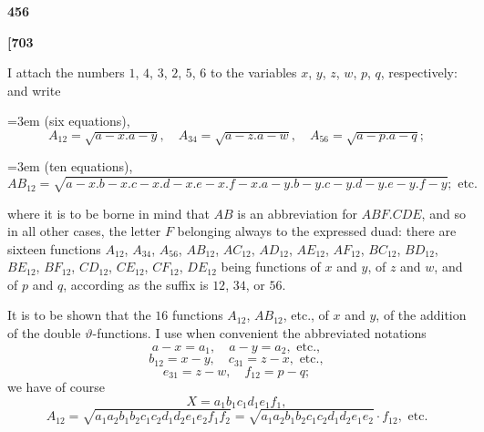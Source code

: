 \documentclass[12pt,a4paper]{article}
\theoremstyle{definition}
\begin{document}
\vspace{1em}

\begin{center}
\textbf{456}
\end{center}

\vspace{0.5em}

\noindent\textbf{[703}

\vspace{0.5em}

I attach the numbers $1$, $4$, $3$, $2$, $5$, $6$ to the variables $x$, $y$, $z$, $w$, $p$, $q$, respectively: and write

\noindent\hangindent=3em (six equations),
\[
A_{12} = \sqrt{a - x . a - y},\quad A_{34} = \sqrt{a - z . a - w},\quad A_{56} = \sqrt{a - p . a - q};
\]

\noindent\hangindent=3em (ten equations),
\[
AB_{12} = \sqrt{a - x . b - x . c - x . d - x . e - x . f - x . a - y . b - y . c - y . d - y . e - y . f - y}; \text{ etc.}
\]

where it is to be borne in mind that $AB$ is an abbreviation for $ABF.CDE$, and so in all other cases, the letter $F$ belonging always to the expressed duad: there are sixteen functions $A_{12}$, $A_{34}$, $A_{56}$, $AB_{12}$, $AC_{12}$, $AD_{12}$, $AE_{12}$, $AF_{12}$, $BC_{12}$, $BD_{12}$, $BE_{12}$, $BF_{12}$, $CD_{12}$, $CE_{12}$, $CF_{12}$, $DE_{12}$ being functions of $x$ and $y$, of $z$ and $w$, and of $p$ and $q$, according as the suffix is $12$, $34$, or $56$.

It is to be shown that the $16$ functions $A_{12}$, $AB_{12}$, etc., of $x$ and $y$, of the addition of the double $\vartheta$-functions. I use when convenient the abbreviated notations
\[
a - x = a_1,\quad a - y = a_2, \text{ etc.},
\]
\[
b_{12} = x - y,\quad c_{31} = z - x, \text{ etc.},
\]
\[
e_{31} = z - w,\quad f_{12} = p - q;
\]
we have of course
\[
X = a_1 b_1 c_1 d_1 e_1 f_1,
\]
\[
A_{12} = \sqrt{a_1 a_2 b_1 b_2 c_1 c_2 d_1 d_2 e_1 e_2 f_1 f_2} = \sqrt{a_1 a_2 b_1 b_2 c_1 c_2 d_1 d_2 e_1 e_2} \cdot f_{12}, \text{ etc.}
\]

\vspace{1em}
\end{document}
